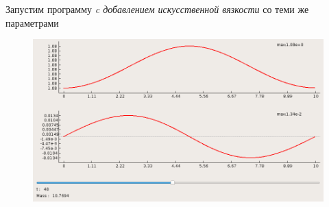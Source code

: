 \documentclass[a4paper, 11pt]{article}
\begin{document}
Запустим программу \textit{c добавлением искусственной вязкости} со теми же параметрами
\begin{figure}[H]
	\includegraphics[width=1\linewidth]{p3/p3_t=48_noscill.png}
\end{figure}
\end{document}
